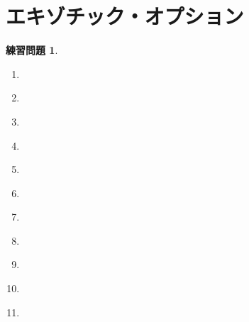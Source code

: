 \documentclass[uplatex]{jsarticle}
\theoremstyle{definition}
\newtheorem{prob}[prob]{練習問題}
\begin{document}
\newpage

\section{エキゾチック・オプション}\label{section: 7}



\begin{prob}\label{prob: 7.1}
  \begin{enumerate}
    \item \label{enumi: 7.1-1}
    \item \label{enumi: 7.1-2}
    \item \label{enumi: 7.1-3}
    \item \label{enumi: 7.1-4}
    \item \label{enumi: 7.1-5}
    \item \label{enumi: 7.1-6}
    \item \label{enumi: 7.1-7}
    \item \label{enumi: 7.1-8}
    \item \label{enumi: 7.1-9}
    \item \label{enumi: 7.1-10}
    \item \label{enumi: 7.1-11}
  \end{enumerate}
\end{prob}
\end{document}
